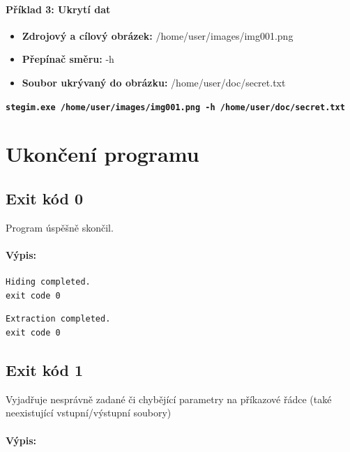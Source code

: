 \documentclass[12pt]{report}
\begin{document}
    \paragraph{Příklad 3: Ukrytí dat}
    \begin{itemize}
        \item \textbf{Zdrojový a cílový obrázek:} /home/user/images/img001.png
        \item \textbf{Přepínač směru:} -h
        \item \textbf{Soubor ukrývaný do obrázku:} /home/user/doc/secret.txt
    \end{itemize}
\texttt{\textbf{stegim.exe /home/user/images/img001.png -h /home/user/doc/secret.txt}}

    \section{Ukončení programu}

    \subsection{Exit kód 0}
    Program úspěšně skončil.

    \paragraph{Výpis:}
    \begin{mdframed}
        \begin{verbatim}
Hiding completed.
exit code 0
        \end{verbatim}
    \end{mdframed}

    \begin{mdframed}
        \begin{verbatim}
Extraction completed.
exit code 0
        \end{verbatim}
    \end{mdframed}

    \subsection{Exit kód 1}
    Vyjadřuje nesprávně zadané či chybějící parametry na příkazové řádce (také
    neexistující vstupní/výstupní soubory)\\

    \paragraph{Výpis:}
\end{document}
